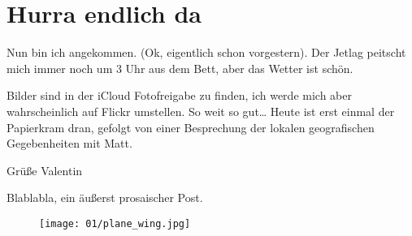 \chapter{Hurra endlich da}

Nun bin ich angekommen. (Ok, eigentlich schon vorgestern). Der Jetlag
peitscht mich immer noch um 3 Uhr aus dem Bett, aber das Wetter ist
schön.

Bilder sind in der iCloud Fotofreigabe zu finden, ich werde mich aber
wahrscheinlich auf Flickr umstellen. So weit so gut\ldots{} Heute ist
erst einmal der Papierkram dran, gefolgt von einer Besprechung der
lokalen geografischen Gegebenheiten mit Matt.

Grüße Valentin

Blablabla, ein äußerst prosaischer Post.

\begin{figure}[p]
  \centering
  \texttt{[image: 01/plane\_wing.jpg]}
\end{figure}
